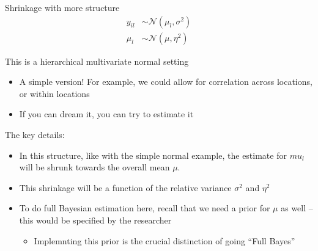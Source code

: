 \documentclass[notes,11pt, aspectratio=169]{beamer}
\newenvironment{wideitemize}{\itemize\addtolength{\itemsep}{10pt}}{\enditemize}
\begin{document}
\begin{frame}{Shrinkage with more structure}
    \begin{align*}
      y_{il} &\sim \mathcal{N}(\mu_{l}, \sigma^{2})\\
      \mu_{l} &\sim \mathcal{N}(\mu, \eta^{2})
    \end{align*}
  \begin{wideitemize}
  \item This is a hierarchical multivariate normal setting
    \begin{itemize}
    \item A simple version! For example, we could allow for
      correlation across locations, or within locations
    \item If you can dream it, you can try to estimate it
    \end{itemize}
  \item The key details:
    \begin{itemize}
    \item In this structure, like with the simple normal example, the
      estimate for $mu_{l}$ will be shrunk towards the overall mean
      $\mu$. 
    \item This shrinkage will be a function of the relative variance $\sigma^{2}$ and $\eta^{2}$
    \item To do full Bayesian estimation here, recall that we need a
      prior for $\mu$ as well -- this would be specified by the
      researcher
      \begin{itemize}
      \item Implemnting this prior is the crucial distinction of going
        ``Full Bayes''
      \end{itemize}
    \end{itemize}
  \end{wideitemize}
\end{frame}
\end{document}
